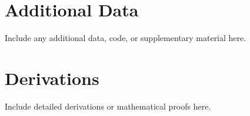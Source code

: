 \documentclass[12pt,a4paper]{report}
\begin{document}
\cleardoublepage
\appendix

\chapter{Additional Data}
\label{app:data}

Include any additional data, code, or supplementary material here.
\cleardoublepage

\chapter{Derivations}
\label{app:derivations}

Include detailed derivations or mathematical proofs here.
\end{document}
